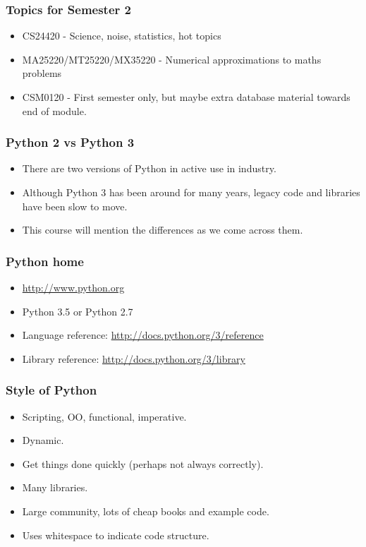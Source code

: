 \documentclass{beamer}
\begin{document}
\begin{frame}
\frametitle{Topics for Semester 2}
\begin{itemize}
\item CS24420 - Science, noise, statistics, hot topics
\item MA25220/MT25220/MX35220 - Numerical approximations to maths problems
\item CSM0120 - First semester only, but maybe extra database material
  towards end of module.
\end{itemize}
\end{frame}



\begin{frame}
\frametitle{Python 2 vs Python 3}
\begin{itemize}
\item There are two versions of Python in active use in industry.
\item Although Python 3 has been around for many years, legacy code
  and libraries
  have been slow to move.
\item This course will mention the differences as we come across them.
\end{itemize}
\end{frame}

\begin{frame}
\frametitle{Python home}
\begin{itemize}
\item \url{http://www.python.org}
\item Python 3.5 or Python 2.7
\item Language reference: \url{http://docs.python.org/3/reference}
\item Library reference: \url{http://docs.python.org/3/library}
\end{itemize}
\end{frame}


\begin{frame}
\frametitle{Style of Python}
\begin{itemize}
\item Scripting, OO, functional, imperative.
\item Dynamic.
\item Get things done quickly (perhaps not always correctly).
\item Many libraries.
\item Large community, lots of cheap books and example code.
\item Uses whitespace to indicate code structure.
\end{itemize}
\end{frame}
\end{document}
